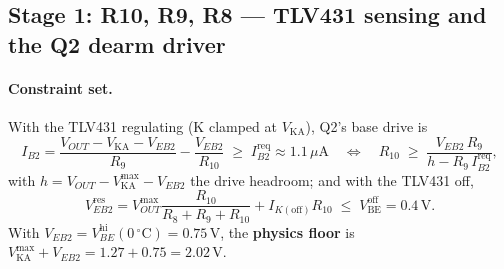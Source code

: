\documentclass[11pt]{article}
\newcommand{\volt}{\mathrm{V}}\newcommand{\ampere}{\mathrm{A}}
\newcommand{\celsius}{{}^{\circ}\mathrm{C}}\newcommand{\second}{\mathrm{s}}
\newcommand{\SI}[2]{\ensuremath{#1\,#2}}
\newcommand{\Vbe}{V_{\mathrm{BE}}}
\newcommand{\Vka}{V_{\mathrm{KA}}}
\newcommand{\Vout}{V_{OUT}}
\newcommand{\uA}{\,\mu\mathrm{A}}
\newcommand{\vhi}{V_{BE}^{\mathrm{hi}}}
\begin{document}
\subsection{Stage 1: R10, R9, R8 --- TLV431 sensing and the Q2 dearm driver}

\paragraph{Constraint set.} With the TLV431 regulating (K clamped at $\Vka$),
Q2's base drive is
\begin{equation}
I_{B2}=\frac{\Vout-\Vka-V_{EB2}}{R_9}-\frac{V_{EB2}}{R_{10}}
\;\ge\;I_{B2}^{\mathrm{req}}\approx1.1\uA
\quad\Longleftrightarrow\quad
R_{10}\;\ge\;\frac{V_{EB2}\,R_9}{h-R_9\,I_{B2}^{\mathrm{req}}},
\label{eq:dearm}
\end{equation}
with $h=\Vout-\Vka^{\max}-V_{EB2}$ the drive headroom; and with the TLV431 off,
\begin{equation}
V_{EB2}^{\mathrm{res}}=\Vout^{\max}\frac{R_{10}}{R_8+R_9+R_{10}}
+I_{K(\mathrm{off})}R_{10}\;\le\;\Vbe^{\mathrm{off}}=\SI{0.4}{\volt}.
\label{eq:resid}
\end{equation}
With $V_{EB2}=\vhi(0\,\celsius)=\SI{0.75}{\volt}$, the \textbf{physics floor}
is $\Vka^{\max}+V_{EB2}=1.27+0.75=\SI{2.02}{\volt}$.
\end{document}
